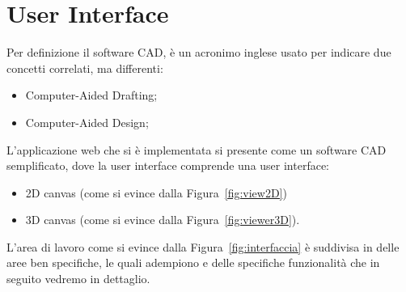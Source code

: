 \newpage
\section{User Interface}
\label{sec:chapter_2_section_4}

Per definizione il software CAD, è un acronimo inglese usato per indicare due concetti correlati, ma differenti:
\begin{itemize}
  \item Computer-Aided Drafting;
  \item Computer-Aided Design;
\end{itemize}
L'applicazione web che si è implementata si presente come un software CAD semplificato, dove la
user interface comprende una user interface:
\begin{itemize}
  \item 2D canvas (come si evince dalla Figura~\ref{fig:view2D})
  \item 3D canvas (come si evince dalla Figura~\ref{fig:viewer3D}).
\end{itemize}

L'area di lavoro come si evince dalla Figura~\ref{fig:interfaccia} è suddivisa in delle aree ben specifiche,
le quali adempiono e delle specifiche funzionalità che in seguito vedremo in dettaglio.\\

